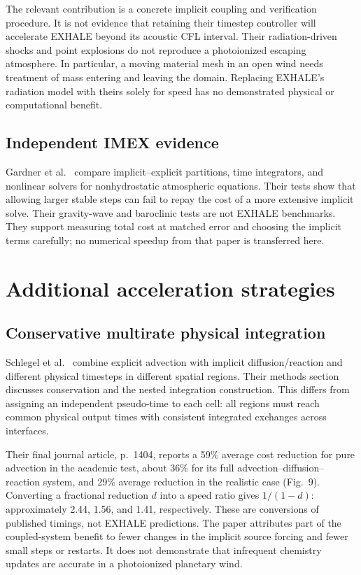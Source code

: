 \documentclass[english,a4paper]{my_memo}
\begin{document}
The relevant contribution is a concrete implicit coupling and verification procedure. It is not evidence that retaining their timestep controller will accelerate EXHALE beyond its acoustic CFL interval. Their radiation-driven shocks and point explosions do not reproduce a photoionized escaping atmosphere. In particular, a moving material mesh in an open wind needs treatment of mass entering and leaving the domain. Replacing EXHALE's radiation model with theirs solely for speed has no demonstrated physical or computational benefit.

\subsection{Independent IMEX evidence}
Gardner et al.\ \cite{gardner} compare implicit--explicit partitions, time integrators, and nonlinear solvers for nonhydrostatic atmospheric equations. Their tests show that allowing larger stable steps can fail to repay the cost of a more extensive implicit solve. Their gravity-wave and baroclinic tests are not EXHALE benchmarks. They support measuring total cost at matched error and choosing the implicit terms carefully; no numerical speedup from that paper is transferred here.

\section{Additional acceleration strategies}
\subsection{Conservative multirate physical integration}
Schlegel et al.\ \cite{schlegel} combine explicit advection with implicit diffusion/reaction and different physical timesteps in different spatial regions. Their methods section discusses conservation and the nested integration construction. This differs from assigning an independent pseudo-time to each cell: all regions must reach common physical output times with consistent integrated exchanges across interfaces.

Their final journal article, p.~1404, reports a 59\% average cost reduction for pure advection in the academic test, about 36\% for its full advection--diffusion--reaction system, and 29\% average reduction in the realistic case (Fig.~9). Converting a fractional reduction $d$ into a speed ratio gives $1/(1-d)$: approximately 2.44, 1.56, and 1.41, respectively. These are conversions of published timings, not EXHALE predictions. The paper attributes part of the coupled-system benefit to fewer changes in the implicit source forcing and fewer small steps or restarts. It does not demonstrate that infrequent chemistry updates are accurate in a photoionized planetary wind.
\end{document}

